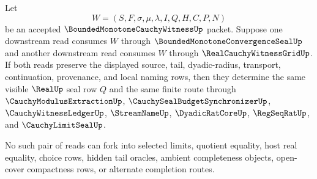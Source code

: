 \begin{theorem}
\label{thm:bounded-monotone-cauchy-witness-convergence-grid-fork-coherence}
Let
$$
W=(S,F,\sigma,\mu,\lambda,I,Q,H,C,P,N)
$$
be an accepted $\BoundedMonotoneCauchyWitnessUp$ packet. Suppose one downstream read consumes $W$ through $\BoundedMonotoneConvergenceSealUp$ and another downstream read consumes $W$ through $\RealCauchyWitnessGridUp$. If both reads preserve the displayed source, tail, dyadic-radius, transport, continuation, provenance, and local naming rows, then they determine the same visible $\RealUp$ seal row $Q$ and the same finite route through $\CauchyModulusExtractionUp$, $\CauchySealBudgetSynchronizerUp$, $\CauchyWitnessLedgerUp$, $\StreamNameUp$, $\DyadicRatCoreUp$, $\RegSeqRatUp$, and $\CauchyLimitSealUp$.

No such pair of reads can fork into selected limits, quotient equality, host real equality, choice rows, hidden tail oracles, ambient completeness objects, open-cover compactness rows, or alternate completion routes.
\end{theorem}
